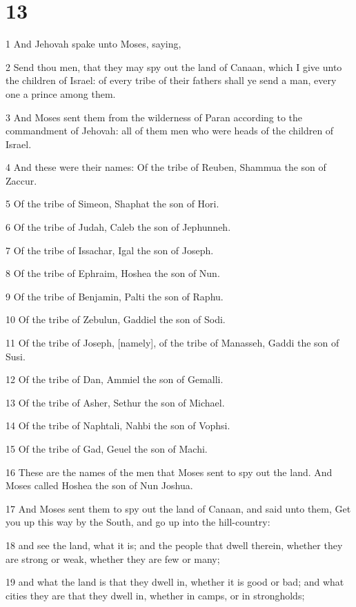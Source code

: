 \chapter{13}

\par 1 And Jehovah spake unto Moses, saying,
\par 2 Send thou men, that they may spy out the land of Canaan, which I give unto the children of Israel: of every tribe of their fathers shall ye send a man, every one a prince among them.
\par 3 And Moses sent them from the wilderness of Paran according to the commandment of Jehovah: all of them men who were heads of the children of Israel.
\par 4 And these were their names: Of the tribe of Reuben, Shammua the son of Zaccur.
\par 5 Of the tribe of Simeon, Shaphat the son of Hori.
\par 6 Of the tribe of Judah, Caleb the son of Jephunneh.
\par 7 Of the tribe of Issachar, Igal the son of Joseph.
\par 8 Of the tribe of Ephraim, Hoshea the son of Nun.
\par 9 Of the tribe of Benjamin, Palti the son of Raphu.
\par 10 Of the tribe of Zebulun, Gaddiel the son of Sodi.
\par 11 Of the tribe of Joseph, [namely], of the tribe of Manasseh, Gaddi the son of Susi.
\par 12 Of the tribe of Dan, Ammiel the son of Gemalli.
\par 13 Of the tribe of Asher, Sethur the son of Michael.
\par 14 Of the tribe of Naphtali, Nahbi the son of Vophsi.
\par 15 Of the tribe of Gad, Geuel the son of Machi.
\par 16 These are the names of the men that Moses sent to spy out the land. And Moses called Hoshea the son of Nun Joshua.
\par 17 And Moses sent them to spy out the land of Canaan, and said unto them, Get you up this way by the South, and go up into the hill-country:
\par 18 and see the land, what it is; and the people that dwell therein, whether they are strong or weak, whether they are few or many;
\par 19 and what the land is that they dwell in, whether it is good or bad; and what cities they are that they dwell in, whether in camps, or in strongholds;
